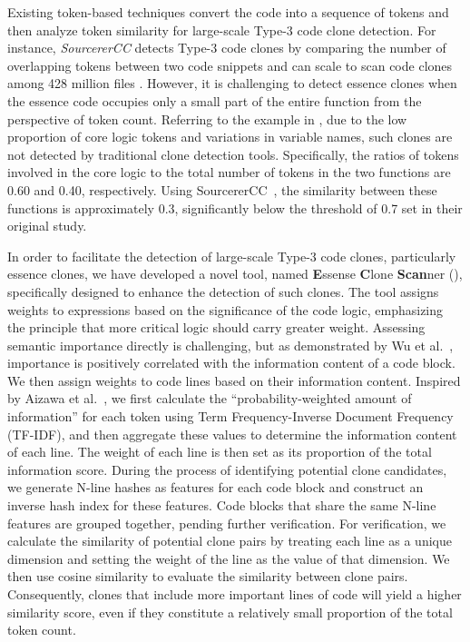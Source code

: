 Existing token-based techniques \cite{gode2009incremental, kamiya2002ccfinder, sajnani2016sourcerercc, li2017cclearner, wang2018ccaligner, golubev2021multi, hung2020cppcd} convert the code into a sequence of tokens and then analyze token similarity for large-scale Type-3 code clone detection.
For instance, \emph{SourcererCC} \cite{sajnani2016sourcerercc} detects Type-3 code clones by comparing the number of overlapping tokens between two code snippets and can scale to scan code clones among 428 million files \cite{lopes2017dejavu}. 
However, it is challenging to detect essence clones when the essence code occupies only a small part of the entire function from the perspective of token count.
Referring to the example in , due to the low proportion of core logic tokens and variations in variable names, such clones are not detected by traditional clone detection tools. 
Specifically, the ratios of tokens involved in the core logic to the total number of tokens in the two functions are 0.60 and 0.40, respectively. 
Using SourcererCC~\cite{sajnani2016sourcerercc}, the similarity between these functions is approximately 0.3, significantly below the threshold of 0.7 set in their original study.

In order to facilitate the detection of large-scale Type-3 code clones, particularly essence clones, we have developed a novel tool, named \textbf{E}ssense \textbf{C}lone \textbf{Scan}ner (\toolname), specifically designed to enhance the detection of such clones. 
The tool assigns weights to expressions based on the significance of the code logic, emphasizing the principle that more critical logic should carry greater weight. 
Assessing semantic importance directly is challenging, but as demonstrated by Wu et al.~\cite{ossfp}, importance is positively correlated with the information content of a code block. 
We then assign weights to code lines based on their information content. 
Inspired by Aizawa et al.~\cite{AIZAWA200345}, we first calculate the ``probability-weighted amount of information'' for each token using Term Frequency-Inverse Document Frequency (TF-IDF), and then aggregate these values to determine the information content of each line. 
The weight of each line is then set as its proportion of the total information score. 
During the process of identifying potential clone candidates, we generate N-line hashes as features for each code block and construct an inverse hash index for these features. 
Code blocks that share the same N-line features are grouped together, pending further verification.
For verification, we calculate the similarity of potential clone pairs by treating each line as a unique dimension and setting the weight of the line as the value of that dimension.
We then use cosine similarity to evaluate the similarity between clone pairs. 
Consequently, clones that include more important lines of code will yield a higher similarity score, even if they constitute a relatively small proportion of the total token count.


